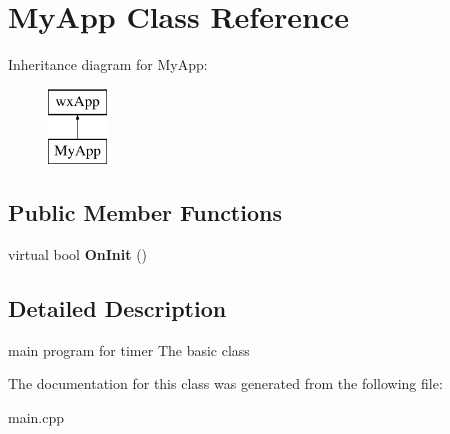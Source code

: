 \hypertarget{class_my_app}{}\section{My\+App Class Reference}
\label{class_my_app}
Inheritance diagram for My\+App\+:\begin{figure}[H]
\begin{center}
\leavevmode
\includegraphics[height=2.000000cm]{class_my_app}
\end{center}
\end{figure}
\subsection*{Public Member Functions}
\begin{DoxyCompactItemize}
\item 
\mbox{\label{class_my_app_a79fa75d1155f0e85e20f2869538296d6}} 
virtual bool {\bfseries On\+Init} ()
\end{DoxyCompactItemize}


\subsection{Detailed Description}
main program for timer The basic class 

The documentation for this class was generated from the following file\+:\begin{DoxyCompactItemize}
\item 
main.\+cpp\end{DoxyCompactItemize}
